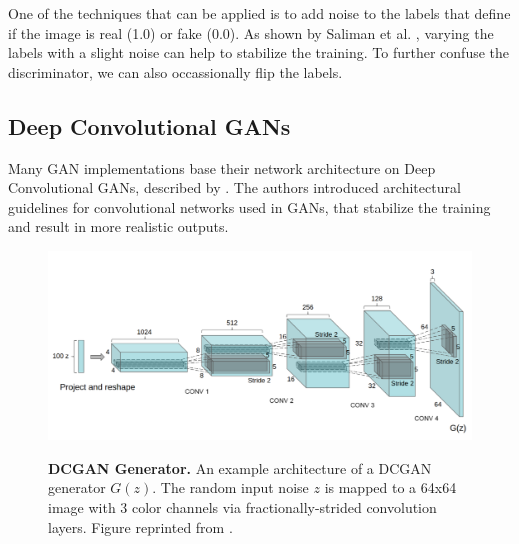\documentclass[12pt]{report}
\begin{document}
One of the techniques that can be applied is to add noise to the labels that define if the image is real (1.0) or fake (0.0). As shown by Saliman et al. \cite{salimans_improved_2016}, varying the labels with a slight noise can help to stabilize the training. To further confuse the discriminator, we can also occassionally flip the labels. 

\subsection{Deep Convolutional GANs} \label{sec:dcgan}


Many GAN implementations base their network architecture on Deep Convolutional GANs, described by \cite{radford_unsupervised_2015}. The authors introduced architectural guidelines for convolutional networks used in GANs, that stabilize the training and result in more realistic outputs.

\begin{figure}[h]
\centering
{\includegraphics[width=\linewidth]{02_background/dcgan_generator}}
\caption{\label{fig:dcgan} \textbf{DCGAN Generator.} An example architecture of a DCGAN generator $G(z)$. The random input noise $z$ is mapped to a 64x64 image with 3 color channels via fractionally-strided convolution layers. Figure reprinted from \cite{radford_unsupervised_2015}.}
\end{figure}
\end{document}
